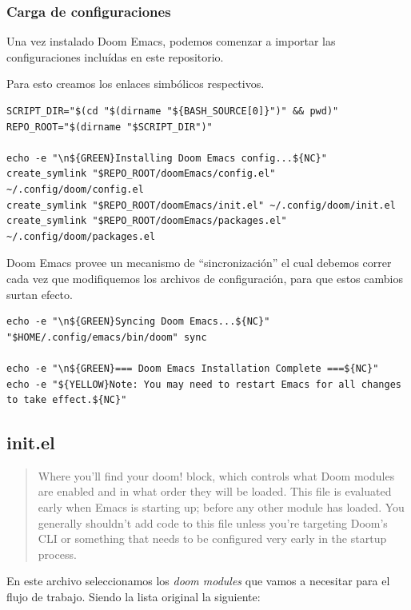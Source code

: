 \documentclass[11pt]{article}
\begin{document}
\subsubsection{Carga de configuraciones}
\label{sec:org4a4f1ff}

Una vez instalado Doom Emacs, podemos comenzar a importar las configuraciones incluídas en este repositorio.

Para esto creamos los enlaces simbólicos respectivos.

\begin{verbatim}
SCRIPT_DIR="$(cd "$(dirname "${BASH_SOURCE[0]}")" && pwd)"
REPO_ROOT="$(dirname "$SCRIPT_DIR")"

echo -e "\n${GREEN}Installing Doom Emacs config...${NC}"
create_symlink "$REPO_ROOT/doomEmacs/config.el" ~/.config/doom/config.el
create_symlink "$REPO_ROOT/doomEmacs/init.el" ~/.config/doom/init.el
create_symlink "$REPO_ROOT/doomEmacs/packages.el" ~/.config/doom/packages.el

\end{verbatim}

Doom Emacs provee un mecanismo de ``sincronización'' el cual debemos correr cada vez que modifiquemos los archivos de configuración, para que estos cambios surtan efecto.

\begin{verbatim}
echo -e "\n${GREEN}Syncing Doom Emacs...${NC}"
"$HOME/.config/emacs/bin/doom" sync

echo -e "\n${GREEN}=== Doom Emacs Installation Complete ===${NC}"
echo -e "${YELLOW}Note: You may need to restart Emacs for all changes to take effect.${NC}"

\end{verbatim}
\subsection{init.el}
\label{sec:org80ac8f2}

\begin{quote}
Where you’ll find your doom! block, which controls what Doom modules are enabled and in what order they will be loaded.
This file is evaluated early when Emacs is starting up; before any other module has loaded. You generally shouldn’t add code to this file unless you’re targeting Doom’s CLI or something that needs to be configured very early in the startup process.
\end{quote}

En este archivo seleccionamos los \emph{doom modules} que vamos a necesitar para el flujo de trabajo. Siendo la lista original la siguiente:
\end{document}
